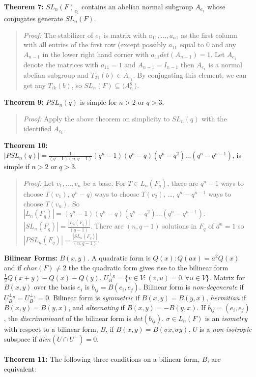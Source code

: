 {\bf Theorem 7:}  $SL_n(F)_{e_1}$ contains an abelian normal subgroup $A_{e_1}$ whose
conjugates generate $SL_n(F)$.
\begin{quote}
\emph{Proof:} The stabilizer of $e_1$ is matrix with $a_{11}, \ldots, a_{n1}$ as the first
column with all entries of the first row (except possibly $a_{11}$ equal to $0$ and any
$A_{n-1}$ in the lower right hand corner with $a_{11} det (A_{n-1}) = 1$.  Let $A_{e_1}$
denote the matrices with $a_{11}=1$ and $A_{n-1}= I_{n-1}$ then $A_{e_1}$ is a normal
abelian subgroup and $T_{21}(b) \in A_{e_1}$.  By conjugating this element, we can get
any $T_{ik}(b)$, so $SL_n(F) \subseteq \langle A_{e_1}^g \rangle $.
\end{quote}
{\bf Theorem 9:}
$PSL_n(q)$ is simple for $n>2$ or $q>3$.
\begin{quote}
\emph {Proof:} Apply the above theorem on simplicity to $SL_n(q)$ with the identified
$A_{e_1}$.
\end{quote}
{\bf Theorem 10:}
$|PSL_n(q)|= {\frac 1 {(q-1)(n,q-1)}} 
(q^{n} -1) (q^{n} -q) (q^{n} -q^{2}) ...  (q^{n} -q^{n-1})$,
is simple if $n>2$ or $q>3$.
\begin{quote}
\emph{Proof:}  
Let $v_1, \ldots, v_n$ be a base.  For $T \in L_n(F_q)$, there are $q^n-1$ ways to choose $T(v_1)$,
$q^n-q)$ ways to choose $T(v_2)$, \ldots, $q^n-q^{n-1}$ ways to choose $T(v_n)$. So
$|L_n(F_q)|= (q^{n} -1) (q^{n} -q) (q^{n} -q^{2}) ...  (q^{n} -q^{n-1})$.
$|SL_n(F_q)|= {\frac {|L_n(F_q)|}{(q-1)}}$.  There are $(n,q-1)$ solutions in $F_q$ of
$d^n=1$ so $|PSL_n(F_q)|= {\frac {|SL_n(F_q)|} {(n,q-1)}}$.
\end{quote}
{\bf Bilinear Forms:}  $B(x,y)$.  A quadratic form is $Q(x): Q(ax)= a^2Q(x)$ and if $char(F) \ne 2$
the the quadratic form gives rise to the bilinear form ${\frac 1 2} Q(x+y)-Q(x)-Q(y)$.
$U_B^{\perp_R} = \{v \in V: (v, u)=0, \forall u \in V \}$.  Matrix for $B(x,y)$ over the
basis $e_i$ is $b_{ij}= B(e_i, e_j)$.  Bilinear form is \emph {non-degenerate} if
$ U_B^{\perp_R} = U_B^{\perp_L} = 0 $.  Bilinear form is 
\emph{symmetric} if $B(x,y)= B(y,x)$, \emph{hermitian} if $B(x,y)= {\overline B(y,x)}$,
and \emph{alternating} if $B(x,y)= -B(y,x)$.  If $b_{ij}= (e_i, e_j)$, the \emph{discrimminant}
of the bilinear form is $det(b_{ij})$.
$\sigma \in L_n(F)$ 
is an \emph{isometry}
with respect to a bilinear form, $B$, 
if $B(x,y)=B(\sigma x, \sigma y)$.  
$U$ is a \emph{non-isotropic} subspace if $dim(U \cap U^{\perp})=0$.
\\
\\
{\bf Theorem 11:} 
The following three conditions on a bilinear form, $B$, are equivalent:
